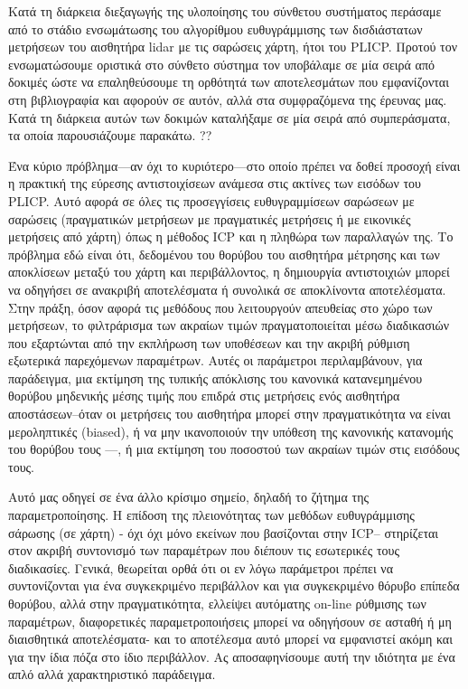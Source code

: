 Κατά τη διάρκεια διεξαγωγής της υλοποίησης του σύνθετου συστήματος περάσαμε
από το στάδιο ενσωμάτωσης του αλγορίθμου ευθυγράμμισης των δισδιάστατων
μετρήσεων του αισθητήρα lidar με τις σαρώσεις χάρτη, ήτοι του PLICP. Προτού
τον ενσωματώσουμε οριστικά στο σύνθετο σύστημα τον υποβάλαμε σε μία σειρά από
δοκιμές ώστε να επαληθεύσουμε τη ορθότητά των αποτελεσμάτων που εμφανίζονται
στη βιβλιογραφία και αφορούν σε αυτόν, αλλά στα συμφραζόμενα της έρευνας μας.
Κατά τη διάρκεια αυτών των δοκιμών καταλήξαμε σε μία σειρά από συμπεράσματα,
τα οποία παρουσιάζουμε παρακάτω. ??

Ένα κύριο πρόβλημα---αν όχι το κυριότερο---στο οποίο πρέπει να δοθεί προσοχή
είναι η πρακτική της εύρεσης αντιστοιχίσεων ανάμεσα στις ακτίνες των εισόδων
του PLICP. Αυτό αφορά σε όλες τις προσεγγίσεις ευθυγραμμίσεων σαρώσεων με
σαρώσεις (πραγματικών μετρήσεων με πραγματικές μετρήσεις ή με εικονικές
μετρήσεις από χάρτη) όπως η μέθοδος ICP και η πληθώρα των παραλλαγών της. Το
πρόβλημα εδώ είναι ότι, δεδομένου του θορύβου του αισθητήρα μέτρησης και των
αποκλίσεων μεταξύ του χάρτη και περιβάλλοντος, η δημιουργία αντιστοιχιών μπορεί
να οδηγήσει σε ανακριβή αποτελέσματα ή συνολικά σε αποκλίνοντα αποτελέσματα.
Στην πράξη, όσον αφορά τις μεθόδους που λειτουργούν απευθείας στο χώρο των
μετρήσεων, το φιλτράρισμα των ακραίων τιμών πραγματοποιείται μέσω διαδικασιών
που εξαρτώνται από την εκπλήρωση των υποθέσεων και την ακριβή ρύθμιση εξωτερικά
παρεχόμενων παραμέτρων. Αυτές οι παράμετροι περιλαμβάνουν, για παράδειγμα, μια
εκτίμηση της τυπικής απόκλισης του κανονικά κατανεμημένου θορύβου μηδενικής
μέσης τιμής που επιδρά στις μετρήσεις ενός αισθητήρα αποστάσεων--όταν οι
μετρήσεις του αισθητήρα μπορεί στην πραγματικότητα να είναι μεροληπτικές
(biased), ή να μην ικανοποιούν την υπόθεση της κανονικής κατανομής του θορύβου
τους \cite{Cooper2018a}---, ή μια εκτίμηση του ποσοστού των ακραίων τιμών στις
εισόδους τους.

Αυτό μας οδηγεί σε ένα άλλο κρίσιμο σημείο, δηλαδή το ζήτημα της
παραμετροποίησης. Η επίδοση της πλειονότητας των μεθόδων ευθυγράμμισης σάρωσης
(σε χάρτη) - όχι όχι μόνο εκείνων που βασίζονται στην ICP-- στηρίζεται στον
ακριβή συντονισμό των παραμέτρων που διέπουν τις εσωτερικές τους διαδικασίες.
Γενικά, θεωρείται ορθά ότι οι εν λόγω παράμετροι πρέπει να συντονίζονται για
ένα συγκεκριμένο περιβάλλον και για συγκεκριμένο θόρυβο επίπεδα θορύβου, αλλά
στην πραγματικότητα, ελλείψει αυτόματης on-line ρύθμισης των παραμέτρων,
διαφορετικές παραμετροποιήσεις μπορεί να οδηγήσουν σε ασταθή ή μη διαισθητικά
αποτελέσματα- και το αποτέλεσμα αυτό μπορεί να εμφανιστεί ακόμη και για την
ίδια πόζα στο ίδιο περιβάλλον.  Ας αποσαφηνίσουμε αυτή την ιδιότητα με ένα απλό
αλλά χαρακτηριστικό παράδειγμα.

